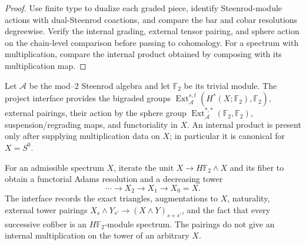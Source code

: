 \begin{proof}
  Use finite type to dualize each graded piece, identify Steenrod-module
  actions with dual-Steenrod coactions, and compare the bar and cobar
  resolutions degreewise.  Verify the internal grading, external tensor
  pairing, and sphere action on the chain-level comparison before passing to
  cohomology.  For a spectrum with multiplication, compare the internal
  product obtained by composing with its multiplication map.
\end{proof}

\begin{definition}
  \label{def:steenrod-ext}
  \notready
  Let $\mathcal A$ be the mod--$2$ Steenrod algebra and let
  $\mathbb F_2$ be its trivial module.  The project interface provides the
  bigraded groups
  $\operatorname{Ext}_{\mathcal A}^{s,t}(H^*(X;\mathbb F_2),\mathbb F_2)$,
  external pairings, their action by the sphere group
  $\operatorname{Ext}_{\mathcal A}^{*,*}(\mathbb F_2,\mathbb F_2)$,
  suspension/regrading maps, and functoriality in $X$.  An internal product is
  present only after supplying multiplication data on $X$; in particular it
  is canonical for $X=S^0$.
\end{definition}

\begin{definition}
  \label{def:hf2-adams-tower}
  \notready
  For an admissible spectrum $X$, iterate the unit
  $X\to H\mathbb F_2\wedge X$ and its fiber to obtain a functorial Adams
  resolution and a decreasing tower
  \[
    \cdots\longrightarrow X_2\longrightarrow X_1\longrightarrow X_0=X.
  \]
  The interface records the exact triangles, augmentations to $X$, naturality,
  external tower pairings
  $X_s\wedge Y_{s'}\to (X\wedge Y)_{s+s'}$, and the fact that every successive
  cofiber is an $H\mathbb F_2$-module spectrum.  The pairings do not give an
  internal multiplication on the tower of an arbitrary $X$.
\end{definition}

